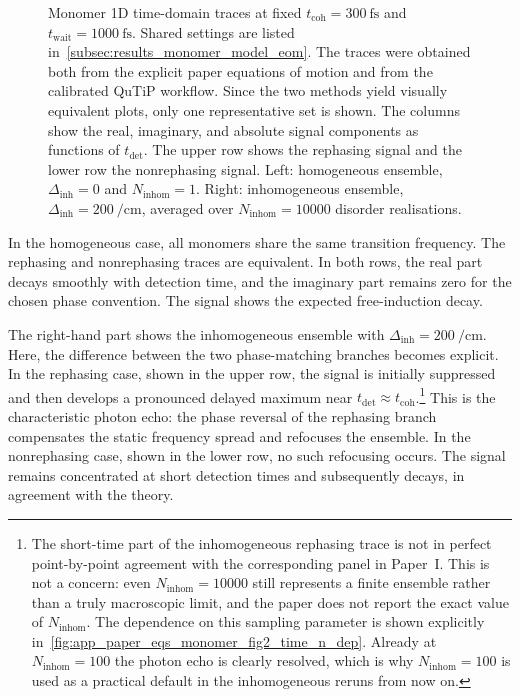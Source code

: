 \begin{figure}[htbp]
    \centering
  \caption{Monomer 1D time-domain traces at fixed $t_{\mathrm{coh}}=\SI{300}{\femto\second}$ and $t_{\mathrm{wait}}=\SI{1000}{\femto\second}$.
  Shared settings are listed in~\autoref{subsec:results_monomer_model_eom}.
    The traces were obtained both from the explicit paper equations of motion and from the calibrated QuTiP workflow. Since the two methods yield visually equivalent plots, only one representative set is shown.
    The columns show the real, imaginary, and absolute signal components as functions of $t_{\mathrm{det}}$.
    The upper row shows the rephasing signal and the lower row the nonrephasing signal.
  Left: homogeneous ensemble, $\Delta_{\mathrm{inh}}=0$ and $N_{\mathrm{inhom}}=1$.
    Right: inhomogeneous ensemble, $\Delta_{\mathrm{inh}}=\SI{200}{\per\centi\metre}$, averaged over $N_{\mathrm{inhom}}=10000$ disorder realisations.}
    \label{fig:results_monomer_1d_time_hom_inhom}
\end{figure}

In the homogeneous case, all monomers share the same transition frequency. The rephasing and nonrephasing traces are equivalent. In both rows, the real part decays smoothly with detection time, and the imaginary part remains zero for the chosen phase convention. The signal shows the expected free-induction decay.

The right-hand part shows the inhomogeneous ensemble with $\Delta_{\mathrm{inh}}=\SI{200}{\per\centi\metre}$. Here, the difference between the two phase-matching branches becomes explicit. In the rephasing case, shown in the upper row, the signal is initially suppressed and then develops a pronounced delayed maximum near $t_{\mathrm{det}}\approx t_{\mathrm{coh}}$.\footnote{The short-time part of the inhomogeneous rephasing trace is not in perfect point-by-point agreement with the corresponding panel in Paper~I. This is not a concern: even $N_{\mathrm{inhom}}=10000$ still represents a finite ensemble rather than a truly macroscopic limit, and the paper does not report the exact value of $N_{\mathrm{inhom}}$. The dependence on this sampling parameter is shown explicitly in~\autoref{fig:app_paper_eqs_monomer_fig2_time_n_dep}. Already at $N_{\mathrm{inhom}}=100$ the photon echo is clearly resolved, which is why $N_{\mathrm{inhom}}=100$ is used as a practical default in the inhomogeneous reruns from now on.}
This is the characteristic photon echo: the phase reversal of the rephasing branch compensates the static frequency spread and refocuses the ensemble. In the nonrephasing case, shown in the lower row, no such refocusing occurs. The signal remains concentrated at short detection times and subsequently decays, in agreement with the theory.

